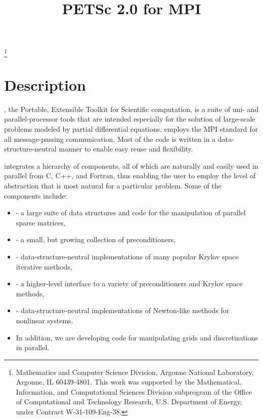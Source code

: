 \pagestyle{empty}

\pagestyle{empty}
\title{PETSc 2.0 for MPI}
\thanks{Mathematics and Computer Science Division,
Argonne National Laboratory,
Argonne, IL 60439-4801.
This work was supported by the Mathematical,
        Information, and Computational Sciences Division subprogram of
        the Office of Computational and Technology Research,
        U.S. Department of Energy, under Contract W-31-109-Eng-38.}

\date{}
\maketitle

\newcommand{\vsp}{\vspace{-1.5mm}}

\section*{Description}

, the Portable, Extensible Toolkit for Scientific computation,
is a suite of uni- and parallel-processor tools that are
intended especially for the solution of large-scale problems modeled
by partial differential equations.
 employs the MPI standard for all
message-passing communication.  Most of the code is written in a
data-structure-neutral manner to enable easy reuse and flexibility.

 integrates a hierarchy of components, all of which
are naturally and easily used in parallel from C, C++, and Fortran,
thus enabling the user to employ the level of abstraction that is 
most natural for a particular problem.  Some of the components include:

\vspace{-.4cm}
\begin{itemize}
\item {} - a large suite of data structures and code
      for the manipulation of parallel sparse matrices,
\vsp
\item {} - a small, but growing collection of preconditioners,
\vsp
\item {} - data-structure-neutral implementations of
      many popular Krylov space iterative methods,
\vsp
\item {} - a higher-level interface to a variety
      of preconditioners and Krylov space methods,
\vsp
\item {} - data-structure-neutral implementations of Newton-like
      methods for nonlinear systems.
\vsp
\item In addition, we are developing code for manipulating grids
      and discretizations in parallel.
\end{itemize}
\vspace{-.3cm}

